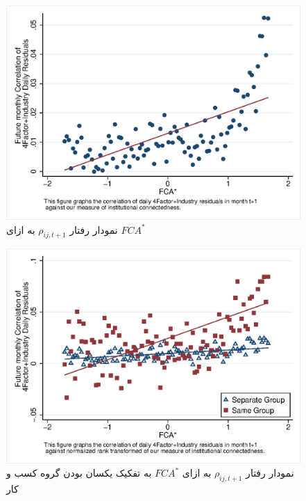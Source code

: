 \documentclass[12pt]{article}
\begin{document}
\begin{appendices}
       
       \begin{figure}[htbp]
       \centering
       \includegraphics[width=.7\linewidth]{mcorr5.eps}
         \caption{نمودار رفتار  
             $ \rho_{ij,{t+1}} $
            به ازای 
         $ FCA^* $ 
         }
         \label{f10}
       \end{figure} 
            \begin{figure}[htbp]
            \centering
            \includegraphics[width=.7\linewidth]{mcorr5g.eps}
\caption{نمودار رفتار  
             $ \rho_{ij,{t+1}} $
            به ازای 
         $ FCA^* $ 
                به تفکیک یکسان بودن گروه کسب و کار}
              \label{f6}
            \end{figure}
            

\end{appendices}
\end{document}
